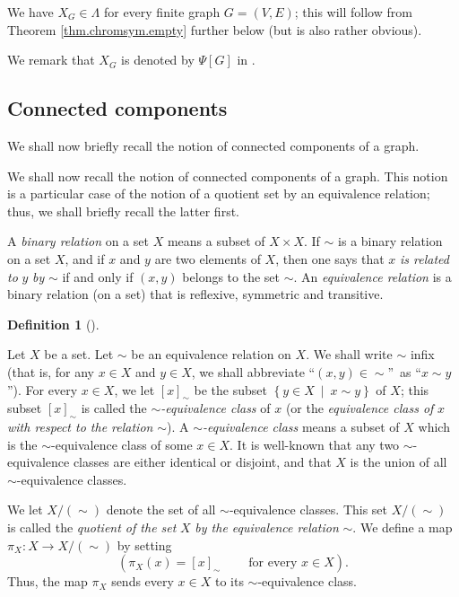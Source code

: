 \documentclass[numbers=enddot,12pt,final,onecolumn,notitlepage]{scrartcl}%
\theoremstyle{definition}
\newtheorem{defi}[theo]{Definition}
\newenvironment{definition}[1][]
{\begin{defi}[#1]\begin{leftbar}}
{\end{leftbar}\end{defi}}
\newenvironment{verlong}{}{}
\newenvironment{vershort}{}{}
\begin{document}
We have $X_{G}\in\Lambda$ for every finite graph $G=\left(  V,E\right)  $;
this will follow from Theorem \ref{thm.chromsym.empty} further below (but is
also rather obvious).

We remark that $X_{G}$ is denoted by $\Psi\left[  G\right]  $ in
\cite[\S 7.3.3]{Reiner}.

\subsection{Connected components}

\begin{vershort}
We shall now briefly recall the notion of connected components of a graph.
\end{vershort}

\begin{verlong}
We shall now recall the notion of connected components of a graph. This notion
is a particular case of the notion of a quotient set by an equivalence
relation; thus, we shall briefly recall the latter first.

A \emph{binary relation} on a set $X$ means a subset of $X\times X$. If $\sim$
is a binary relation on a set $X$, and if $x$ and $y$ are two elements of $X$,
then one says that $x$ \emph{is related to }$y$ \emph{by }$\sim$ if and only
if $\left(  x,y\right)  $ belongs to the set $\sim$. An \emph{equivalence
relation} is a binary relation (on a set) that is reflexive, symmetric and transitive.

\begin{definition}
\label{def.relquot}Let $X$ be a set. Let $\sim$ be an equivalence relation on
$X$. We shall write $\sim$ infix (that is, for any $x\in X$ and $y\in X$, we
shall abbreviate \textquotedblleft$\left(  x,y\right)  \in\left.  \sim\right.
$\textquotedblright\ as \textquotedblleft$x\sim y$\textquotedblright). For
every $x\in X$, we let $\left[  x\right]  _{\sim}$ be the subset $\left\{
y\in X\ \mid\ x\sim y\right\}  $ of $X$; this subset $\left[  x\right]
_{\sim}$ is called the $\sim$\emph{-equivalence class} of $x$ (or the
\emph{equivalence class of }$x$ \emph{with respect to the relation }$\sim$). A
$\sim$\emph{-equivalence class} means a subset of $X$ which is the $\sim
$-equivalence class of some $x\in X$. It is well-known that any two $\sim
$-equivalence classes are either identical or disjoint, and that $X$ is the
union of all $\sim$-equivalence classes.

We let $X/\left(  \sim\right)  $ denote the set of all $\sim$-equivalence
classes. This set $X/\left(  \sim\right)  $ is called the \emph{quotient of
the set }$X$ \emph{by the equivalence relation }$\sim$. We define a map
$\pi_{X}:X\rightarrow X/\left(  \sim\right)  $ by setting%
\[
\left(  \pi_{X}\left(  x\right)  =\left[  x\right]  _{\sim}%
\ \ \ \ \ \ \ \ \ \ \text{for every }x\in X\right)  .
\]
Thus, the map $\pi_{X}$ sends every $x\in X$ to its $\sim$-equivalence class.
\end{definition}


\end{verlong}
\end{document}
